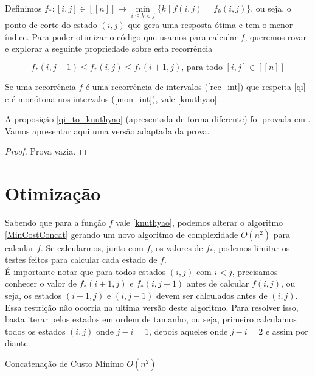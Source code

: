 Definimos $f_* : [i,j] \in [[n]] \mapsto \min\limits_{i \leq k < j} \Big\{ k \mid f(i,j) = f_k(i,j) \Big\}$, ou seja, o ponto de corte do estado $(i,j)$ que gera uma resposta ótima e tem o menor índice. Para poder otimizar o código que usamos para calcular $f$, queremos rovar e explorar a seguinte propriedade sobre esta recorrência

\begin{equation} \label{knuthyao}
f_*(i,j-1) \leq f_*(i,j) \leq f_*(i+1,j) \text{, para todo } [i,j] \in [[n]]
\end{equation}

\begin{prop} \label{qi_to_knuthyao}
Se uma recorrência $f$ é uma recorrência de intervalos (\ref{rec_int}) que respeita \ref{qi} e é monótona nos intervalos (\ref{mon_int}), vale \ref{knuthyao}.
\end{prop}

A proposição \ref{qi_to_knuthyao} (apresentada de forma diferente) foi provada em \cite{Yao:1980}. Vamos apresentar aqui uma versão adaptada da prova.

\begin{proof}
Prova vazia.
\end{proof}

\section{Otimização}

Sabendo que para a função $f$ vale \ref{knuthyao}, podemos alterar o algoritmo \ref{MinCostConcat} gerando um novo algoritmo de complexidade $O(n^2)$ para calcular $f$. Se calcularmos, junto com $f$, os valores de $f_*$, podemos limitar os testes feitos para calcular cada estado de $f$. \\
É importante notar que para todos estados $(i,j)$ com $i < j$, precisamos conhecer o valor de $f_*(i+1, j)$ e $f_*(i,j-1)$ antes de calcular $f(i,j)$, ou seja, os estados $(i+1,j)$ e $(i,j-1)$ devem ser calculados antes de $(i,j)$. Essa restrição não ocorria na ultima versão deste algoritmo. Para resolver isso, basta iterar pelos estados em ordem de tamanho, ou seja, primeiro calculamos todos os estados $(i,j)$ onde $j-i = 1$, depois aqueles onde $j-i = 2$ e assim por diante.

\begin{algorithm}[h]
\caption{Concatenação de Custo Mínimo $O(n^2)$}
\label{alg_MinCostConcatOpt}
\begin{algorithmic}[1]
\State \Return {}
\EndFunction
\end{algorithmic}
\end{algorithm}

